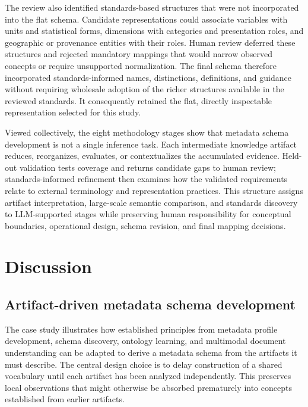 \documentclass{article}
\begin{document}
The review also identified standards-based structures that were not incorporated into the flat schema. Candidate representations could associate variables with units and statistical forms, dimensions with categories and presentation roles, and geographic or provenance entities with their roles. Human review deferred these structures and rejected mandatory mappings that would narrow observed concepts or require unsupported normalization. The final schema therefore incorporated standards-informed names, distinctions, definitions, and guidance without requiring wholesale adoption of the richer structures available in the reviewed standards. It consequently retained the flat, directly inspectable representation selected for this study.

Viewed collectively, the eight methodology stages show that metadata schema development is not a single inference task. Each intermediate knowledge artifact reduces, reorganizes, evaluates, or contextualizes the accumulated evidence. Held-out validation tests coverage and returns candidate gaps to human review; standards-informed refinement then examines how the validated requirements relate to external terminology and representation practices. This structure assigns artifact interpretation, large-scale semantic comparison, and standards discovery to LLM-supported stages while preserving human responsibility for conceptual boundaries, operational design, schema revision, and final mapping decisions.

\section{Discussion}

\subsection{Artifact-driven metadata schema development}

The case study illustrates how established principles from metadata profile development, schema discovery, ontology learning, and multimodal document understanding can be adapted to derive a metadata schema from the artifacts it must describe. The central design choice is to delay construction of a shared vocabulary until each artifact has been analyzed independently. This preserves local observations that might otherwise be absorbed prematurely into concepts established from earlier artifacts.
\end{document}
